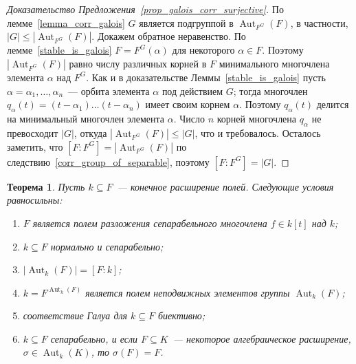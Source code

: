 \documentclass[a4paper,11pt]{scrartcl}
\theoremstyle{plain}
\newtheorem{theorem}{Теорема}[subsection]
\theoremstyle{definition}
\newcommand\sseq{\subseteq}
\newcommand\Aut{\operatorname{Aut}}
\begin{document}
\begin{proof}[Доказательство
  Предложения~\ref{prop_galois_corr_surjective}]
По лемме~\ref{lemma_corr_galois} $G$ является подгруппой в
$\Aut_{F^G}(F)$, в частности, $|G|\leq |\Aut_{F^G}(F)|$. Докажем
обратное неравенство.
По лемме~\ref{stable_is_galois} $F=F^G(\alpha)$
для некоторого $\alpha\in F$.
Поэтому $|\Aut_{F^G}(F)|$ равно числу различных
корней в $F$ минимального многочлена элемента $\alpha$ над $F^G$.
Как и в
доказательстве Леммы~\ref{stable_is_galois} пусть
$\alpha=\alpha_1,\dots,\alpha_n$~--- орбита элемента $\alpha$ под
действием $G$; тогда
многочлен $q_\alpha(t)=(t-\alpha_1)\dots(t-\alpha_n)$ имеет своим
корнем $\alpha$.
Поэтому $q_\alpha(t)$ делится на минимальный многочлен
элемента $\alpha$. Число $n$ корней многочлена $q_\alpha$ не
превосходит $|G|$, откуда
$|\Aut_{F^G}(F)|\leq |G|$, что и требовалось.
Осталось заметить, что $[F:F^G]=|\Aut_{F^G}(F)|$ по
следствию~\ref{corr_group_of_separable}, поэтому $[F:F^G]=|G|$.
\end{proof}

\begin{theorem}\label{thm_galois}
Пусть $k\sseq F$~--- конечное расширение полей. Следующие условия
равносильны:
\begin{enumerate}
\item $F$ является полем разложения сепарабельного многочлена $f\in
  k[t]$ над $k$;
\item $k\sseq F$ нормально и сепарабельно;
\item $|\Aut_k(F)|=[F:k]$;
\item $k=F^{\Aut_k(F)}$ является полем неподвижных элементов группы
  $\Aut_k(F)$;
\item соответствие Галуа для $k\sseq F$ биективно;
\item $k\sseq F$ сепарабельно, и если $F\sseq K$~--- некоторое
  алгебраическое расширение, $\sigma\in\Aut_k(K)$, то $\sigma(F)=F$.
\end{enumerate}
\end{theorem}
\end{document}
